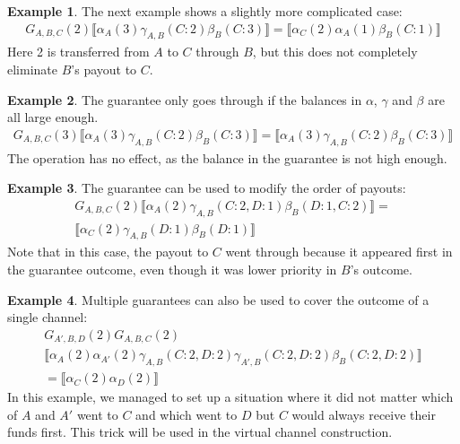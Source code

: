 \documentclass{article}
\theoremstyle{definition}
\newtheorem{example}{Example}[section]
\newcommand{\adj}[1]{\llbracket #1 \rrbracket}
\begin{document}
\begin{example}
  The next example shows a slightly more complicated case:
  \begin{align*}
    G_{A, B, C}(2)\adj{\alpha_A(3)\gamma_{A, B}(C: 2)\beta_B(C: 3)} = \adj{\alpha_C(2)\alpha_A(1)\beta_B(C:1)}
  \end{align*}
  Here 2 is transferred from $A$ to $C$ through $B$, but this does not completely eliminate $B$'s payout to $C$.
\end{example}

\begin{example}
  The guarantee only goes through if the balances in $\alpha$, $\gamma$ and $\beta$ are all large enough.
  \begin{align*}
    G_{A, B, C}(3)\adj{\alpha_A(3)\gamma_{A, B}(C: 2)\beta_B(C: 3)} = \adj{\alpha_A(3)\gamma_{A, B}(C: 2)\beta_B(C: 3)}
  \end{align*}
  The operation has no effect, as the balance in the guarantee is not high enough.
\end{example}

\begin{example}
  The guarantee can be used to modify the order of payouts:
  \begin{multline*}
    G_{A, B, C}(2)\adj{\alpha_A(2)\gamma_{A, B}(C: 2, D: 1)\beta_B(D: 1, C: 2)} =\\ \adj{\alpha_C(2)\gamma_{A, B}(D: 1)\beta_B(D: 1)}
  \end{multline*}
  Note that in this case, the payout to $C$ went through because it appeared first in the guarantee outcome, even though it was lower priority in $B$'s outcome.
\end{example}

\begin{example}
  Multiple guarantees can also be used to cover the outcome of a single channel:
  \begin{multline*}
    G_{A', B, D}(2)G_{A, B, C}(2)\\\adj{\alpha_A(2)\alpha_{A'}(2)\gamma_{A, B}(C: 2, D: 2)\gamma_{A', B}(C: 2, D: 2)\beta_B(C: 2, D: 2)}\\ = \adj{\alpha_C(2)\alpha_D(2)}
  \end{multline*}
  In this example, we managed to set up a situation where it did not matter which of $A$ and $A'$ went to $C$ and which went to $D$ but $C$ would always receive their funds first.
  This trick will be used in the virtual channel construction.
\end{example}
\end{document}
